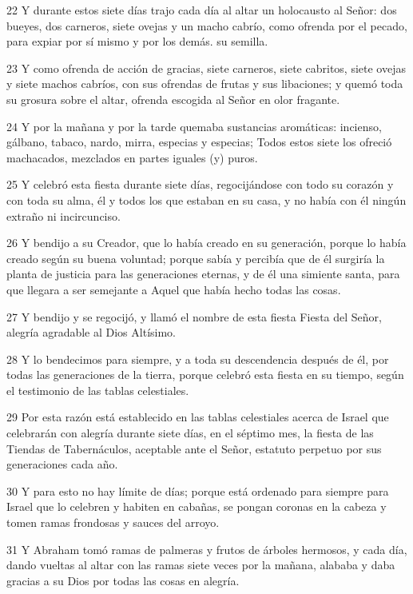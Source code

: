 \par 22 Y durante estos siete días trajo cada día al altar un holocausto al Señor: dos bueyes, dos carneros, siete ovejas y un macho cabrío, como ofrenda por el pecado, para expiar por sí mismo y por los demás. su semilla.
\par 23 Y como ofrenda de acción de gracias, siete carneros, siete cabritos, siete ovejas y siete machos cabríos, con sus ofrendas de frutas y sus libaciones; y quemó toda su grosura sobre el altar, ofrenda escogida al Señor en olor fragante.
\par 24 Y por la mañana y por la tarde quemaba sustancias aromáticas: incienso, gálbano, tabaco, nardo, mirra, especias y especias; Todos estos siete los ofreció machacados, mezclados en partes iguales (y) puros.
\par 25 Y celebró esta fiesta durante siete días, regocijándose con todo su corazón y con toda su alma, él y todos los que estaban en su casa, y no había con él ningún extraño ni incircunciso.
\par 26 Y bendijo a su Creador, que lo había creado en su generación, porque lo había creado según su buena voluntad; porque sabía y percibía que de él surgiría la planta de justicia para las generaciones eternas, y de él una simiente santa, para que llegara a ser semejante a Aquel que había hecho todas las cosas.
\par 27 Y bendijo y se regocijó, y llamó el nombre de esta fiesta Fiesta del Señor, alegría agradable al Dios Altísimo.
\par 28 Y lo bendecimos para siempre, y a toda su descendencia después de él, por todas las generaciones de la tierra, porque celebró esta fiesta en su tiempo, según el testimonio de las tablas celestiales.
\par 29 Por esta razón está establecido en las tablas celestiales acerca de Israel que celebrarán con alegría durante siete días, en el séptimo mes, la fiesta de las Tiendas de Tabernáculos, aceptable ante el Señor, estatuto perpetuo por sus generaciones cada año.
\par 30 Y para esto no hay límite de días; porque está ordenado para siempre para Israel que lo celebren y habiten en cabañas, se pongan coronas en la cabeza y tomen ramas frondosas y sauces del arroyo.
\par 31 Y Abraham tomó ramas de palmeras y frutos de árboles hermosos, y cada día, dando vueltas al altar con las ramas siete veces por la mañana, alababa y daba gracias a su Dios por todas las cosas en alegría.

